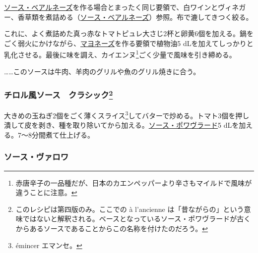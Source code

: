 \begin{recette}
\protect\hyperlink{sauce-bearnaise}{ソース・ベアルネーズ}を作る場合とまったく同じ要領で、白ワインとヴィネガー、香草類を煮詰める（\protect\hyperlink{sauce-bearnaise}{ソース・ベアルネーズ}）参照。布で漉してきつく絞る。

これに、よく煮詰めた真っ赤なトマトピュレ大さじ2杯と卵黄6個を加える。鍋をごく弱火にかけながら、\protect\hyperlink{mayonnaise}{マヨネーズ}を作る要領で植物油5
dLを加えてしっかりと乳化させる。最後に味を調え、カイエンヌ\footnote{赤唐辛子の一品種だが、日本のカエンペッパーより辛さもマイルドで風味が違うことに注意。}ごく少量で風味を引き締める。

\ldots{}\ldots{}このソースは牛肉、羊肉のグリルや魚のグリル焼きに合う。

\hypertarget{sauce-tyrolienne-a-l-ancienne}{%
\subsubsection[チロル風ソース　クラシック]{\texorpdfstring{チロル風ソース　クラシック\footnote{このレシピは第四版のみ。ここでの
  à l'ancienne
  は「昔ながらの」という意味ではないと解釈される。ベースとなっているソース・ポワヴラードが古くからあるソースであることからこの名称を付けたのだろう。}}{チロル風ソース　クラシック}}\label{sauce-tyrolienne-a-l-ancienne}}



大きめの玉ねぎ2個をごく薄くスライス\footnote{émincer エマンセ。}してバターで炒める。トマト3個を押し潰して皮を剥き、種を取り除いてから加える。\protect\hyperlink{sauce-poivrade}{ソース・ポワヴラード}5
dLを加える。7〜8分間煮て仕上げる。

\hypertarget{sauce-valois}{%
\subsubsection{ソース・ヴァロワ}\label{sauce-valois}}




\end{recette}
